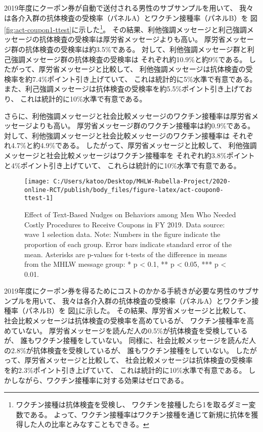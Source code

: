 \documentclass[
  11pt,
  a4paper,
]{article}
\begin{document}
2019年度にクーポン券が自動で送付される男性のサブサンプルを用いて、
我々は各介入群の抗体検査の受検率（パネルA）とワクチン接種率（パネルB）を
図\ref{fig:act-coupon1-ttest}に示した\footnote{ワクチン接種は抗体検査を受検し、
  ワクチンを接種したら1を取るダミー変数である。
  よって、ワクチン接種率はワクチン接種を通じて新規に抗体を獲得した人の比率とみなすこともできる。}。
その結果、利他強調メッセージと利己強調メッセージの抗体検査の受検率は厚労省メッセージよりも高い。
厚労省メッセージ群の抗体検査の受検率は約3.5\%である。
対して、利他強調メッセージ群と利己強調メッセージ群の抗体検査の受検率は
それぞれ約10.9\%と約9\%である。
したがって、厚労省メッセージと比較して、
利他強調メッセージは抗体検査の受検率を約7.4\%ポイント引き上げていて、
これは統計的に5\%水準で有意である。
また、利己強調メッセージは抗体検査の受検率を約5.5\%ポイント引き上げており、
これは統計的に10\%水準で有意である。

さらに、利他強調メッセージと社会比較メッセージのワクチン接種率は厚労省メッセージよりも高い。
厚労省メッセージ群のワクチン接種率は約0.9\%である。
対して、利他強調メッセージと社会比較メッセージのワクチン接種率は
それぞれ4.7\%と約4.9\%である。
したがって、厚労省メッセージと比較して、
利他強調メッセージと社会比較メッセージはワクチン接種率を
それぞれ約3.8\%ポイントと4\%ポイント引き上げていて、
これらは統計的に10\%水準で有意である。

\begin{figure}[t]
\texttt{[image: C:/Users/katoo/Desktop/MHLW-Rubella-Project/2020-online-RCT/publish/body\_files/figure-latex/act-coupon0-ttest-1]} \caption{Effect of Text-Based Nudges on Behaviors among Men Who Needed Costly Procedures to Receive Coupons in FY 2019. Data source: wave 1 selection data. Note: Numbers in the figure indicate the proportion of each group. Error bars indicate standard error of the mean. Asterisks are p-values for t-tests of the difference in means from the MHLW message group: * p < 0.1, ** p < 0.05, *** p < 0.01.}\label{fig:act-coupon0-ttest}
\end{figure}

2019年度にクーポン券を得るためにコストのかかる手続きが必要な男性のサブサンプルを用いて、
我々は各介入群の抗体検査の受検率（パネルA）とワクチン接種率（パネルB）を
図\ref{fig:act-coupon0-ttest}に示した。
その結果、厚労省メッセージと比較して、
社会比較メッセージは抗体検査の受検率を高めているが、
ワクチン接種率を高めていない。
厚労省メッセージを読んだ人の0.5\%が抗体検査を受検しているが、
誰もワクチン接種をしていない。
同様に、社会比較メッセージを読んだ人の2.8\%が抗体検査を受検しているが、
誰もワクチン接種をしていない。
したがって、厚労省メッセージと比較して、
社会比較メッセージは抗体検査の受検率を約2.3\%ポイント引き上げていて、
これは統計的に10\%水準で有意である。
しかしながら、ワクチン接種率に対する効果はゼロである。
\end{document}
